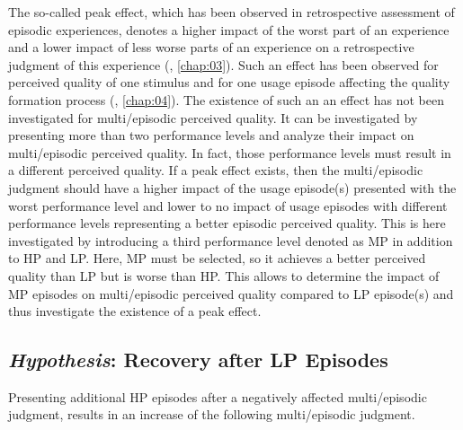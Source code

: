 The so-called peak effect, which has been observed in retrospective assessment of episodic experiences, denotes a higher impact of the worst part of an experience and a lower impact of less worse parts of an experience on a retrospective judgment of this experience (\cf, \autoref{chap:03}).
Such an effect has been observed for perceived quality of one stimulus and for one usage episode affecting the quality formation process (\cf, \autoref{chap:04}).
The existence of such an an effect has not been investigated for multi\-/episodic perceived quality.
It can be investigated by presenting more than two performance levels and analyze their impact on multi\-/episodic perceived quality.
In fact, those performance levels must result in a different perceived quality.
If a peak effect exists, then the multi\-/episodic judgment should have a higher impact of the usage episode(s) presented with the worst performance level and lower to no impact of usage episodes with different performance levels representing a better episodic perceived quality.
This is here investigated by introducing a third performance level denoted as \ac{MP} in addition to \ac{HP} and \ac{LP}.
Here, \ac{MP} must be selected, so it achieves a better perceived quality than \ac{LP} but is worse than \ac{HP}.
This allows to determine the impact of \ac{MP} episodes on multi\-/episodic perceived quality compared to \ac{LP} episode(s) and thus investigate the existence of a peak effect.



\subsection[H5: Recovery after \acs{LP} Episodes]{\emph{Hypothesis}: Recovery after \acs{LP} Episodes}
\begin{hypothesis}\label{hypo:recovery}
Presenting additional \ac{HP} episodes after a negatively affected multi\-/episodic judgment, results in an increase of the following multi\-/episodic judgment.
\end{hypothesis}

